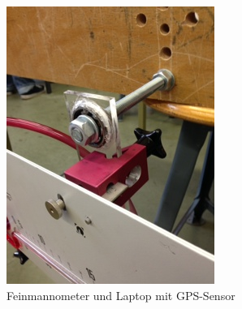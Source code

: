 \begin{figure}
\centering
	\includegraphics[width=\textwidth]{images/aufhaengung.JPG}
	\caption{Feinmannometer und Laptop mit GPS-Sensor}
	\label{aufhängung}
\end{figure}